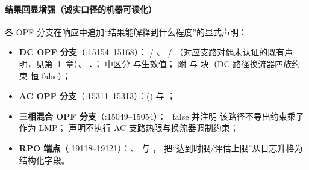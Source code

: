 \paragraph{结果回显增强（诚实口径的机器可读化）}
各 OPF 分支在响应中追加``结果能解释到什么程度''的显式声明：
\begin{itemize}
  \item \textbf{DC OPF 分支}（:15154--15168）： /
        、 /
        （对应支路对偶未认证的既有声明，见第~1~章）、
        、；
         中区分  与生效值；
        附  与  块（DC 路径换流器四族约束
        恒 false）；
  \item \textbf{AC OPF 分支}（:15311--15313）：()
        与 ；
  \item \textbf{三相混合 OPF 分支}（:15049--15054）：=false 并注明
        该路径不导出约束乘子作为 LMP； 声明不执行
        AC 支路热限与换流器调制约束；
  \item \textbf{RPO 端点}（:19118--19121）：、
         与 ，
        把``达到时限/评估上限''从日志升格为结构化字段。
\end{itemize}

